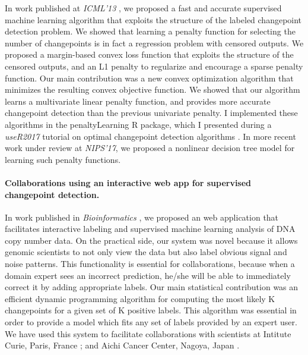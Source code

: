 \documentclass{article}
\begin{document}
In work published at \emph{ICML'13} \citep{HOCKING-penalties}, we
proposed a fast and accurate supervised machine learning algorithm
that exploits the structure of the labeled changepoint detection
problem. We showed that learning a penalty function for selecting the
number of changepoints is in fact a regression problem with censored
outputs. 
We proposed a margin-based convex loss function that exploits the
structure of the censored outputs, and an L1 penalty to regularize and
encourage a sparse penalty function. Our main contribution was a new
convex optimization algorithm that minimizes the resulting convex
objective function. We showed that our algorithm learns a multivariate
linear penalty function, and provides more accurate changepoint
detection than the previous univariate penalty. I implemented these
algorithms in the penaltyLearning R package, which I presented during
a \emph{useR2017} tutorial on optimal changepoint detection algorithms
\citep{change-tutorial}. In more recent work under review at
\emph{NIPS'17}, we proposed a nonlinear decision tree model for
learning such penalty functions. 

\paragraph{Collaborations using an interactive web app for supervised
  changepoint detection.} In work published in \emph{Bioinformatics}
\citep{hocking-SegAnnDB}, we proposed an web application that
facilitates interactive labeling and supervised machine learning
analysis of DNA copy number data. On the practical side, our system
was novel because it allows genomic scientists to not only view the
data but also label obvious signal and noise patterns. This
functionality is essential for collaborations, because when a domain
expert sees an incorrect prediction, he/she will be able to
immediately correct it by adding appropriate labels. Our main
statistical contribution was an efficient dynamic programming
algorithm for computing the most likely K changepoints for a given set
of K positive labels. This algorithm was essential in order to provide a model
which fits any set of labels provided by an expert user. We have used
this system to facilitate collaborations with scientists at Intitute
Curie, Paris, France \citep{Chicard}; and Aichi Cancer Center, Nagoya,
Japan \citep{Hocking-Leukemia-2016,m14:clonal}.
\end{document}
